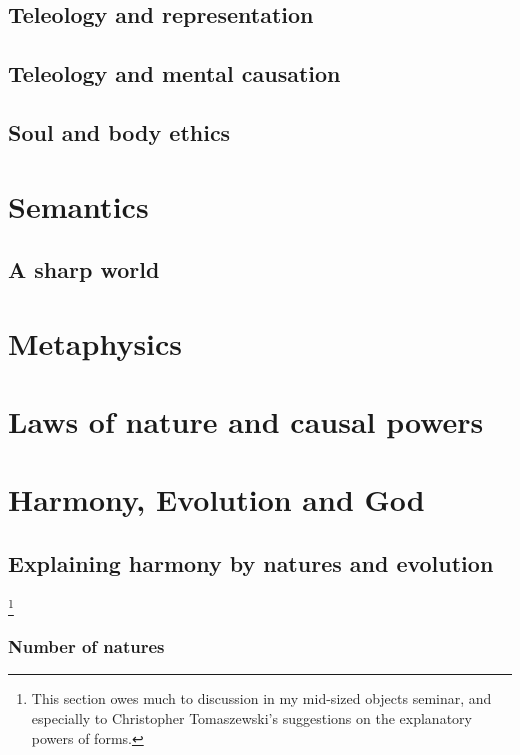 \section{Teleology and representation}
\section{Teleology and mental causation}
\section{Soul and body ethics}
\chaptertail 

\def\mychapter{VI}

\chapter{Semantics}\label{ch:semantics}
\section{A sharp world}
\chaptertail

\def\mychapter{VII}

\chapter{Metaphysics}\label{ch:metaphysics}
\chaptertail 

\def\mychapter{VIII}

\chapter{Laws of nature and causal powers}\label{ch:laws}
\chaptertail

\def\mychapter{IX}

\chapter{Harmony, Evolution and God}\label{ch:God}
\section{Explaining harmony by natures and evolution}
\footnote{This section owes much to discussion in my mid-sized objects seminar, and especially to Christopher Tomaszewski's suggestions on the explanatory powers of forms.}
\subsection{Number of natures}
